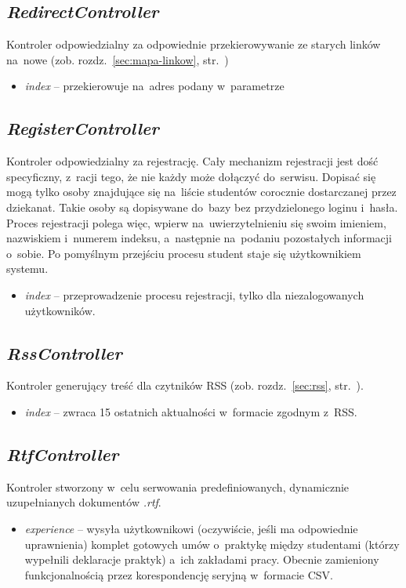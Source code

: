 \documentclass[a4paper,12pt,oneside]{report}
\begin{document}
\subsection{\emph{RedirectController}}
\label{con:redirect}
  Kontroler odpowiedzialny za odpowiednie przekierowywanie ze starych linków na~nowe (zob. rozdz.~\ref{sec:mapa-linkow}, str.~\pageref{sec:mapa-linkow})
\begin{itemize}
  \item \emph{index} -- przekierowuje na~adres podany w~parametrze
\end{itemize}

\subsection{\emph{RegisterController}}
\label{con:register}
Kontroler odpowiedzialny za rejestrację. Cały mechanizm rejestracji jest dość specyficzny, z~racji tego, że nie każdy może dołączyć do~serwisu. Dopisać się mogą tylko osoby znajdujące się na~liście studentów corocznie dostarczanej przez dziekanat. Takie osoby są dopisywane do~bazy bez przydzielonego loginu i~hasła. Proces rejestracji polega więc, wpierw na~uwierzytelnieniu się swoim imieniem, nazwiskiem i~numerem indeksu, a~następnie na~podaniu pozostałych informacji o~sobie. Po pomyślnym przejściu procesu student staje się użytkownikiem systemu.
\begin{itemize}
  \item \emph{index} -- przeprowadzenie procesu rejestracji, tylko dla niezalogowanych użytkowników.
\end{itemize}

\subsection{\emph{RssController}}
\label{con:rss}
  Kontroler generujący treść dla czytników RSS (zob. rozdz.~\ref{sec:rss}, str.~\pageref{sec:rss}).

\begin{itemize}
  \item \emph{index} -- zwraca 15 ostatnich aktualności w~formacie zgodnym z~RSS.
\end{itemize}

\subsection{\emph{RtfController}}
\label{con:rtf}
  Kontroler stworzony w~celu serwowania predefiniowanych, dynamicznie uzupełnianych dokumentów \emph{.rtf}.
\begin{itemize}
  \item \emph{experience} -- wysyła użytkownikowi (oczywiście, jeśli ma odpowiednie uprawnienia) komplet gotowych umów o~praktykę między studentami (którzy wypełnili deklaracje praktyk) a~ich zakładami pracy. Obecnie zamieniony funkcjonalnością przez korespondencję seryjną w~formacie CSV.
\end{itemize}
\end{document}
